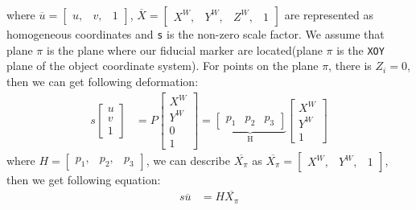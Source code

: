 where $\overline{u} = \begin{bmatrix} u,&v,&1 \end{bmatrix}$, $\overline{X}=\begin{bmatrix} X^W, &Y^W, &Z^W, &1 \end{bmatrix}$ are represented as homogeneous coordinates and \texttt{s} is the non-zero scale factor. We assume that plane $\pi$ is the plane where our fiducial marker are located(plane $\pi$ is the \texttt{XOY} plane of the object coordinate system). For points on the plane $\pi$, there is $Z_i = 0$, then we can get following deformation:
\begin{align*}
s \begin{bmatrix} u \\ v \\ 1 \end{bmatrix} &= P \begin{bmatrix} X^W \\ Y^W \\ 0 \\ 1 \end{bmatrix} = 
\underbrace{\begin{bmatrix} p_1 & p_2 & p_3 \end{bmatrix}}_\text{H}
 \begin{bmatrix} X^W \\ Y^W \\ 1 \end{bmatrix}
\end{align*}
where $H = \begin{bmatrix} p_1,&p_2,&p_3 \end{bmatrix}$, we can describe $\overline{X_{\pi}}$ as $\overline{X_{\pi}} = \begin{bmatrix} X^W,&Y^W,&1 \end{bmatrix}$, then we get following equation:
\begin{align}\label{equ:suhx}
s\overline{u} &= H\overline{X_{\pi}}
\end{align}

